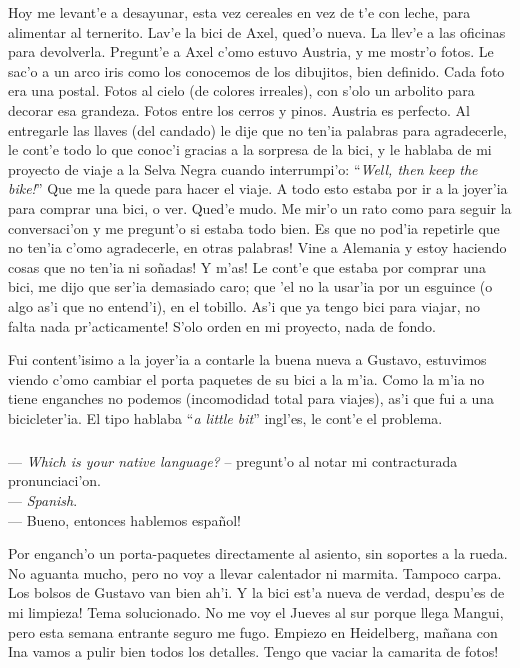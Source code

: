 Hoy me levant'e a desayunar, esta vez cereales en vez de t'e con
leche, para alimentar al ternerito. Lav'e la bici de Axel, qued'o nueva. La
llev'e a las oficinas para devolverla. Pregunt'e a Axel c'omo estuvo Austria, y
me mostr'o fotos. Le sac'o a un arco iris como los conocemos de los dibujitos,
bien definido. Cada foto era una postal. Fotos al cielo (de colores
irreales), con s'olo un arbolito para decorar esa grandeza. Fotos entre los
cerros y pinos. Austria es perfecto. Al entregarle las llaves (del candado) le
dije que no ten'ia palabras para agradecerle, le cont'e todo lo que conoc'i
gracias a la sorpresa de la bici, y le hablaba de mi proyecto de viaje a la
Selva Negra cuando interrumpi'o: ``\emph{Well, then keep the bike!}'' Que me la
quede para hacer el viaje. A todo esto estaba por ir a la joyer'ia para comprar
una bici, o ver. Qued'e mudo. Me mir'o un rato como para seguir la conversaci'on
y me pregunt'o si estaba todo bien. \textexclamdown Es que no pod'ia repetirle
que no ten'ia c'omo agradecerle, en otras palabras! \textexclamdown Vine a
Alemania y estoy haciendo cosas que no ten'ia ni so\~nadas! \textexclamdown Y
m'as! Le cont'e que estaba por comprar una bici, me dijo que ser'ia demasiado
caro; que 'el no la usar'ia por un esguince (o algo as'i que no entend'i), en el
tobillo. As'i que ya tengo bici para viajar, \textexclamdown no falta nada
pr'acticamente! S'olo orden en mi proyecto, nada de fondo.

Fui content'isimo a la joyer'ia a contarle la buena nueva a Gustavo, estuvimos
viendo c'omo cambiar el porta paquetes de su bici a la m'ia. Como la m'ia no
tiene enganches no podemos (incomodidad total para viajes), as'i que fui a una
bicicleter'ia. El tipo hablaba ``\emph{a little bit}'' ingl'es, le cont'e el
problema.

\subparagraph{}\label{ssub:native-language}
--- \emph{Which is your native language?} -- pregunt'o al notar mi contracturada pronunciaci'on.\\
--- \emph{Spanish}.\\
--- Bueno, \textexclamdown entonces hablemos espa\~nol!\\
\hangindent=1cm

Por  enganch'o un porta-paquetes directamente al asiento, sin
soportes a la rueda. No aguanta mucho, pero no voy a llevar calentador ni
marmita. Tampoco carpa. Los bolsos de Gustavo van bien ah'i. \textexclamdown Y
la bici est'a nueva de verdad, despu'es de mi limpieza! Tema solucionado. No me
voy el Jueves al sur porque llega Mangui, pero esta semana entrante seguro me
fugo. Empiezo en Heidelberg, ma\~nana con Ina vamos a pulir bien todos los
detalles. \textexclamdown Tengo que vaciar la camarita de fotos!\\

